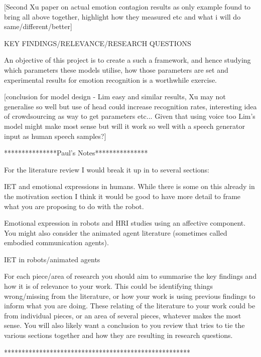 \documentclass[11pt]{article}
\begin{document}
[Second Xu paper on actual emotion contagion results as only example found to bring all above together, highlight how they measured etc and what i will do same/different/better]


KEY FINDINGS/RELEVANCE/RESEARCH QUESTIONS

An objective of this project is to create a such a framework, and hence studying which parameters these models utilise, how those parameters are set and experimental results for emotion recognition is a worthwhile exercise.

[conclusion for model design - Lim easy and similar results, Xu may not generalise so well but use of head could increase recognition rates, interesting idea of crowdsourcing as way to get parameters etc... Given that using voice too Lim's model might make most sense but will it work so well with a speech generator input as human speech samples?]

***************Paul's Notes***************

For the literature review I would break it up in to several sections:

IET and emotional expressions in humans. While there is some on this already in the motivation section I think it would be good to have more detail to frame what you are proposing to do with the robot.

Emotional expression in robots and HRI studies using an affective component. You might also consider the animated agent literature (sometimes called embodied communication agents).

IET in robots/animated agents

For each piece/area of research you should aim to summarise the key findings and how it is of relevance to your work. This could be identifying things wrong/missing from the literature, or how your work is using previous findings to inform what you are doing. These relating of the literature to your work could be from individual pieces, or an area of several pieces, whatever makes the most sense. You will also likely want a conclusion to you review that tries to tie the various sections together and how they are resulting in research questions.

*****************************************************
\end{document}
